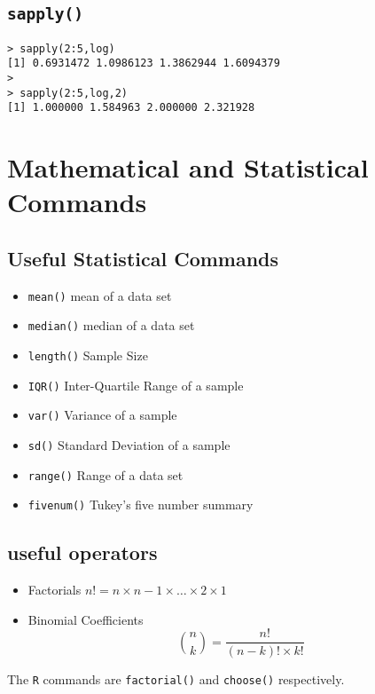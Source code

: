 \documentclass[a4paper,12pt]{article}
\begin{document}
\subsection*{\texttt{sapply()}}
\begin{framed}
\begin{verbatim}
> sapply(2:5,log)
[1] 0.6931472 1.0986123 1.3862944 1.6094379
>
> sapply(2:5,log,2)
[1] 1.000000 1.584963 2.000000 2.321928
\end{verbatim}
\end{framed}






\section{Mathematical and Statistical Commands}

\subsection{Useful Statistical Commands}
\begin{itemize}
\item \texttt{mean()} mean of a data set
\item \texttt{median()} median of a data set
\item \texttt{length()} Sample Size
\item \texttt{IQR()} Inter-Quartile Range of a sample
\item \texttt{var()} Variance of a sample
\item \texttt{sd()} Standard Deviation  of a sample
\item \texttt{range()} Range of a data set
\item \texttt{fivenum()} Tukey's five number summary
\end{itemize}

\subsection{useful operators}

\begin{itemize}
\item Factorials
$n! = n \times n-1 \times \ldots \times 2 \times 1 $
\item Binomial Coefficients
\[ { n \choose k }  = \frac{n!}{(n-k)! \times k!}\]
\end{itemize}
The \texttt{R} commands are \texttt{factorial()} and \texttt{choose()} respectively.
\end{document}
